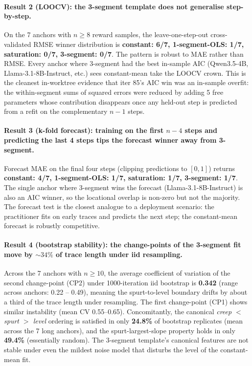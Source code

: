 \paragraph{Result 2 (LOOCV): the 3-segment template does not
generalise step-by-step.}
\label{par:scaling-iter89-loocv}

On the 7 anchors with $n \ge 8$ reward samples, the leave-one-step-out
cross-validated RMSE winner distribution is \textbf{constant: 6/7,
1-segment-OLS: 1/7, saturation: 0/7, 3-segment: 0/7}.  The pattern is
robust to MAE rather than RMSE.  Every anchor where 3-segment had the
best in-sample AIC (Qwen3.5-4B, Llama-3.1-8B-Instruct, etc.) sees
constant-mean take the LOOCV crown.  This is the cleanest in-worktree
evidence that iter 85's AIC win was an in-sample overfit: the
within-segment sums of squared errors were reduced by adding 5 free
parameters whose contribution disappears once any held-out step is
predicted from a refit on the complementary $n-1$ steps.

\paragraph{Result 3 (k-fold forecast): training on the first
$n-4$ steps and predicting the last 4 steps tips the forecast winner
away from 3-segment.}
\label{par:scaling-iter89-forecast}

Forecast MAE on the final four steps (clipping predictions to
$[0, 1]$) returns \textbf{constant: 4/7, 1-segment-OLS: 1/7,
saturation: 1/7, 3-segment: 1/7}.  The single anchor where 3-segment
wins the forecast (Llama-3.1-8B-Instruct) is also an AIC winner, so
the locational overlap is non-zero but not the majority.  The forecast
test is the closest analogue to a deployment scenario: the practitioner
fits on early traces and predicts the next step; the constant-mean
forecast is robustly competitive.

\paragraph{Result 4 (bootstrap stability): the change-points of the
3-segment fit move by $\sim\!\! 34\%$ of trace length under iid
resampling.}
\label{par:scaling-iter89-bootstrap}

Across the 7 anchors with $n \ge 10$, the average coefficient of
variation of the second change-point (CP2) under 1000-iteration iid
bootstrap is \textbf{0.342} (range across anchors: 0.22 -- 0.49),
meaning the spurt-to-level boundary drifts by about a third of the
trace length under resampling.  The first change-point (CP1) shows
similar instability (mean CV 0.55--0.65).  Concomitantly, the canonical
\emph{creep $<$ spurt $>$ level} ordering is satisfied in only
\textbf{24.8\%} of bootstrap replicates (mean across the 7 long
anchors), and the spurt-largest-slope property holds in only
\textbf{49.4\%} (essentially random).  The 3-segment template's
canonical features are not stable under even the mildest noise model
that disturbs the level of the constant-mean fit.


